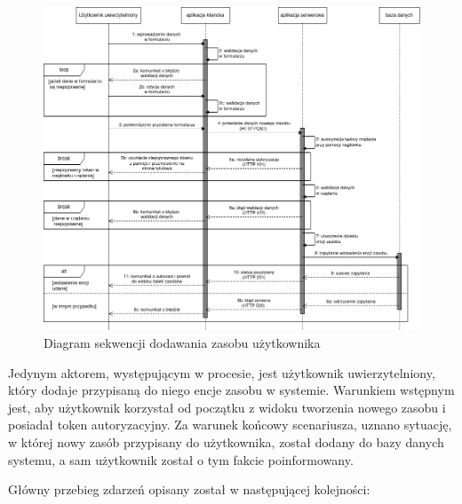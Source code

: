 \begin{figure}[!htbp] 
    \centering
    \includegraphics[width=\textwidth]{img/chapter4/open-osp.uml-diagrams-sequence.create-resource.png}
    \caption{Diagram sekwencji dodawania zasobu użytkownika}
    \label{fig:uml.sequence.create-resource}
\end{figure}

Jedynym aktorem, występującym w procesie, jest użytkownik uwierzytelniony, który dodaje przypisaną do niego encje zasobu w systemie. Warunkiem wstępnym jest, aby użytkownik korzystał od początku z widoku tworzenia nowego zasobu i posiadał token autoryzacyjny. Za warunek końcowy scenariusza, uznano sytuację, w której nowy zasób przypisany do użytkownika, został dodany do bazy danych systemu, a sam użytkownik został o tym fakcie poinformowany.

Główny przebieg zdarzeń opisany został w następującej kolejności:

